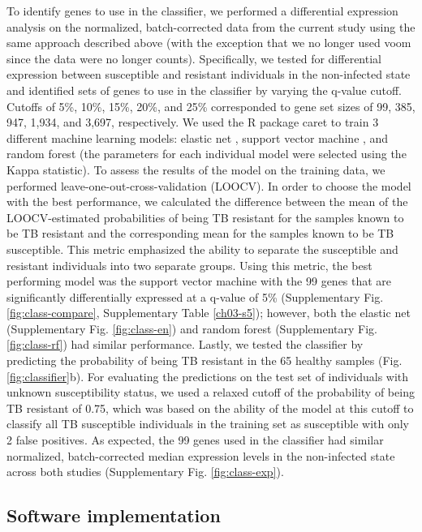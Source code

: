 To identify genes to use in the classifier, we performed a
differential expression analysis on the normalized, batch-corrected
data from the current study using the same approach described above
(with the exception that we no longer used voom \citep{Law2014} since
the data were no longer counts). Specifically, we tested for
differential expression between susceptible and resistant individuals
in the non-infected state and identified sets of genes to use in the
classifier by varying the q-value cutoff. Cutoffs of 5\%, 10\%, 15\%,
20\%, and 25\% corresponded to gene set sizes of 99, 385, 947, 1,934,
and 3,697, respectively. We used the R package caret \citep{Kuhn2008}
to train 3 different machine learning models: elastic net
\citep{Friedman2010}, support vector machine \citep{Karatzoglou2004},
and random forest \citep{Liaw2002} (the parameters for each individual
model were selected using the Kappa statistic). To assess the results
of the model on the training data, we performed
leave-one-out-cross-validation (LOOCV). In order to choose the model
with the best performance, we calculated the difference between the
mean of the LOOCV-estimated probabilities of being TB resistant for
the samples known to be TB resistant and the corresponding mean for
the samples known to be TB susceptible. This metric emphasized the
ability to separate the susceptible and resistant individuals into two
separate groups. Using this metric, the best performing model was the
support vector machine with the 99 genes that are significantly
differentially expressed at a q-value of 5\% (Supplementary Fig.
\ref{fig:class-compare}, Supplementary Table \ref{ch03-s5}); however,
both the elastic net (Supplementary Fig. \ref{fig:class-en}) and
random forest (Supplementary Fig. \ref{fig:class-rf}) had similar
performance.  Lastly, we tested the classifier by predicting the
probability of being TB resistant in the 65 healthy samples (Fig.
\ref{fig:classifier}b). For evaluating the predictions on the test set
of individuals with unknown susceptibility status, we used a relaxed
cutoff of the probability of being TB resistant of 0.75, which was
based on the ability of the model at this cutoff to classify all TB
susceptible individuals in the training set as susceptible with only 2
false positives. As expected, the 99 genes used in the classifier had
similar normalized, batch-corrected median expression levels in the
non-infected state across both studies (Supplementary Fig.
\ref{fig:class-exp}).
\subsection{Software implementation}

